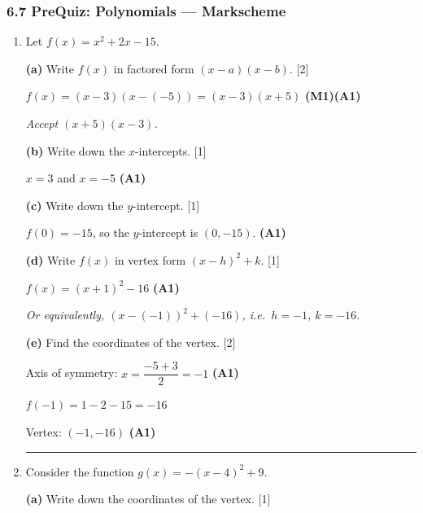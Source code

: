 \documentclass[12pt, twoside]{article}
\begin{document}
\subsubsection*{6.7 PreQuiz: Polynomials --- Markscheme}

\begin{enumerate}[itemsep=0.3cm]

\item[1.] [Maximum mark: 7]

Let $f(x) = x^2 + 2x - 15$.

\medskip

\textbf{(a)} Write $f(x)$ in factored form $(x - a)(x - b)$. \hfill [2]

$f(x) = (x - 3)(x - (-5)) = (x - 3)(x + 5)$ \hfill \textbf{(M1)(A1)}

\emph{Accept $(x + 5)(x - 3)$.}

\medskip

\textbf{(b)} Write down the $x$-intercepts. \hfill [1]

$x = 3$ and $x = -5$ \hfill \textbf{(A1)}

\medskip

\textbf{(c)} Write down the $y$-intercept. \hfill [1]

$f(0) = -15$, so the $y$-intercept is $(0, -15)$. \hfill \textbf{(A1)}

\medskip

\textbf{(d)} Write $f(x)$ in vertex form $(x - h)^2 + k$. \hfill [1]

$f(x) = (x + 1)^2 - 16$ \hfill \textbf{(A1)}

\emph{Or equivalently, $(x - (-1))^2 + (-16)$, i.e.\ $h = -1$, $k = -16$.}

\medskip

\textbf{(e)} Find the coordinates of the vertex. \hfill [2]

Axis of symmetry: $x = \dfrac{-5 + 3}{2} = -1$ \hfill \textbf{(A1)}

$f(-1) = 1 - 2 - 15 = -16$

Vertex: $(-1, -16)$ \hfill \textbf{(A1)}

\bigskip
\hrule
\bigskip

\item[2.] [Maximum mark: 7]

Consider the function $g(x) = -(x - 4)^2 + 9$.

\medskip

\textbf{(a)} Write down the coordinates of the vertex. \hfill [1]


\end{enumerate}
\end{document}
